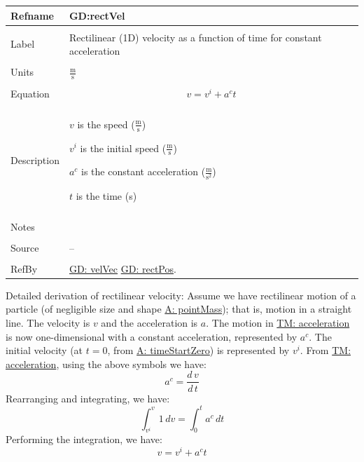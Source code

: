 \documentclass[12pt]{article}
\begin{document}
\noindent \begin{minipage}{\textwidth}
\begin{tabular}{p{} p{}}
\toprule \textbf{Refname} & \textbf{GD:rectVel}
\label{GD:rectVel}
\\ \midrule \\
Label & Rectilinear (1D) velocity as a function of time for constant acceleration
\\ \midrule \\
Units & $\frac{\text{m}}{\text{s}}$
\\ \midrule \\
Equation & \begin{displaymath}
           v={v^{i}}+{a^{c}} t
           \end{displaymath}
\\ \midrule \\
Description & \begin{symbDescription}
              \item{$v$ is the speed ($\frac{\text{m}}{\text{s}}$)}
              \item{${v^{i}}$ is the initial speed ($\frac{\text{m}}{\text{s}}$)}
              \item{${a^{c}}$ is the constant acceleration ($\frac{\text{m}}{\text{s}^{2}}$)}
              \item{$t$ is the time (s)}
              \end{symbDescription}
\\ \midrule \\
Notes & 
\\ \midrule \\
Source & --
\\ \midrule \\
RefBy & \hyperref[GD:velVec]{GD: velVec} \hyperref[GD:rectPos]{GD: rectPos}.
\\ \bottomrule \end{tabular}
\end{minipage}
Detailed derivation of rectilinear velocity:
Assume we have rectilinear motion of a particle (of negligible size and shape \hyperref[pointMass]{A: pointMass}); that is, motion in a straight line. The velocity is $v$ and the acceleration is $a$. The motion in \hyperref[TM:acceleration]{TM: acceleration} is now one-dimensional with a constant acceleration, represented by ${a^{c}}$. The initial velocity (at $t=0$, from \hyperref[timeStartZero]{A: timeStartZero}) is represented by ${v^{i}}$. From \hyperref[TM:acceleration]{TM: acceleration}, using the above symbols we have:
\begin{displaymath}
{a^{c}}=\frac{d\,v}{d\,t}
\end{displaymath}
Rearranging and integrating, we have:
\begin{displaymath}
\int_{{v^{i}}}^{v}{1}\,dv=\int_{0}^{t}{{a^{c}}}\,dt
\end{displaymath}
Performing the integration, we have:
\begin{displaymath}
v={v^{i}}+{a^{c}} t
\end{displaymath}
\par~
\end{document}
